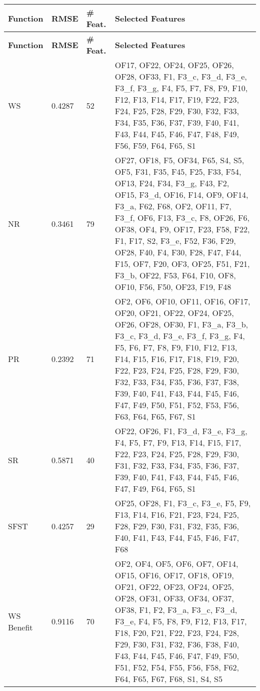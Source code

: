 \begin{longtable}{|p{3cm}|p{2cm}|p{2cm}|p{8cm}|}
\hline
\textbf{Function} & \textbf{RMSE} & \textbf{\# Feat.} & \textbf{Selected Features} \\ \hline
\endfirsthead
\hline
\textbf{Function} & \textbf{RMSE} & \textbf{\# Feat.} & \textbf{Selected Features} \\ \hline
\endhead

WS & 0.4287 & 52 & OF17, OF22, OF24, OF25, OF26, OF28, OF33, F1, F3\_c, F3\_d, F3\_e, F3\_f, F3\_g, F4, F5, F7, F8, F9, F10, F12, F13, F14, F17, F19, F22, F23, F24, F25, F28, F29, F30, F32, F33, F34, F35, F36, F37, F39, F40, F41, F43, F44, F45, F46, F47, F48, F49, F56, F59, F64, F65, S1 \\ \hline
NR & 0.3461 & 79 & OF27, OF18, F5, OF34, F65, S4, S5, OF5, F31, F35, F45, F25, F33, F54, OF13, F24, F34, F3\_g, F43, F2, OF15, F3\_d, OF16, F14, OF9, OF14, F3\_a, F62, F68, OF2, OF11, F7, F3\_f, OF6, F13, F3\_c, F8, OF26, F6, OF38, OF4, F9, OF17, F23, F58, F22, F1, F17, S2, F3\_e, F52, F36, F29, OF28, F40, F4, F30, F28, F47, F44, F15, OF7, F20, OF3, OF25, F51, F21, F3\_b, OF22, F53, F64, F10, OF8, OF10, F56, F50, OF23, F19, F48 \\ \hline
PR & 0.2392 & 71 & OF2, OF6, OF10, OF11, OF16, OF17, OF20, OF21, OF22, OF24, OF25, OF26, OF28, OF30, F1, F3\_a, F3\_b, F3\_c, F3\_d, F3\_e, F3\_f, F3\_g, F4, F5, F6, F7, F8, F9, F10, F12, F13, F14, F15, F16, F17, F18, F19, F20, F22, F23, F24, F25, F28, F29, F30, F32, F33, F34, F35, F36, F37, F38, F39, F40, F41, F43, F44, F45, F46, F47, F49, F50, F51, F52, F53, F56, F63, F64, F65, F67, S1 \\ \hline
SR & 0.5871 & 40 & OF22, OF26, F1, F3\_d, F3\_e, F3\_g, F4, F5, F7, F9, F13, F14, F15, F17, F22, F23, F24, F25, F28, F29, F30, F31, F32, F33, F34, F35, F36, F37, F39, F40, F41, F43, F44, F45, F46, F47, F49, F64, F65, S1 \\ \hline
SFST & 0.4257 & 29 & OF25, OF28, F1, F3\_c, F3\_e, F5, F9, F13, F14, F16, F21, F23, F24, F25, F28, F29, F30, F31, F32, F35, F36, F40, F41, F43, F44, F45, F46, F47, F68 \\ \hline
WS Benefit & 0.9116 & 70 & OF2, OF4, OF5, OF6, OF7, OF14, OF15, OF16, OF17, OF18, OF19, OF21, OF22, OF23, OF24, OF25, OF28, OF31, OF33, OF34, OF37, OF38, F1, F2, F3\_a, F3\_c, F3\_d, F3\_e, F4, F5, F8, F9, F12, F13, F17, F18, F20, F21, F22, F23, F24, F28, F29, F30, F31, F32, F36, F38, F40, F43, F44, F45, F46, F47, F49, F50, F51, F52, F54, F55, F56, F58, F62, F64, F65, F67, F68, S1, S4, S5 \\ \hline

\end{longtable}
